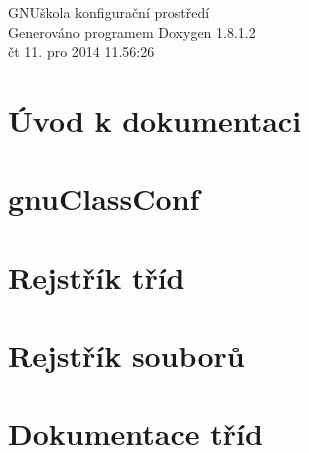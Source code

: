\documentclass{book}
\begin{document}
\hypersetup{pageanchor=false,citecolor=blue}
\begin{titlepage}
\vspace*{7cm}
\begin{center}
{\Large G\-N\-Uškola konfigurační prostředí }\\
\vspace*{1cm}
{\large Generováno programem Doxygen 1.8.1.2}\\
\vspace*{0.5cm}
{\small čt 11. pro 2014 11.56:26}\\
\end{center}
\end{titlepage}
\clearemptydoublepage
{}
\tableofcontents
\clearemptydoublepage
{}
\hypersetup{pageanchor=true,citecolor=blue}
\chapter{Úvod k dokumentaci}
\label{index}\hypertarget{index}{}
\chapter{gnu\-Class\-Conf}
\label{md_README}
\hypertarget{md_README}{}

\chapter{Rejstřík tříd}

\chapter{Rejstřík souborů}

\chapter{Dokumentace tříd}



































\end{document}
